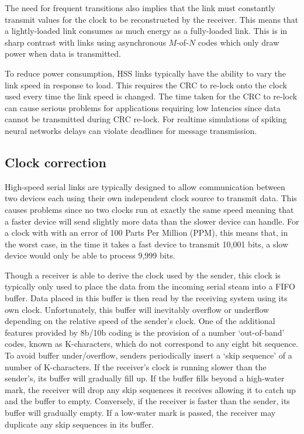 			The need for frequent transitions also implies that the link must
			constantly transmit values for the clock to be reconstructed by the
			receiver. This means that a lightly-loaded link consumes as much energy as
			a fully-loaded link. This is in sharp contrast with links using
			asynchronous $M$-of-$N$ codes which only draw power when data is
			transmitted.
			
			To reduce power consumption, HSS links typically have the ability to vary
			the link speed in response to load.  This requires the CRC to re-lock onto
			the clock used every time the link speed is changed. The time taken for
			the CRC to re-lock can cause serious problems for applications requiring
			low latencies since data cannot be transmitted during CRC re-lock. For
			realtime simulations of spiking neural networks delays can violate
			deadlines for message transmission.
		
		\subsection{Clock correction}
			
			High-speed serial links are typically designed to allow communication
			between two devices each using their own independent clock source to
			transmit data. This causes problems since no two clocks run at exactly the
			same speed meaning that a faster device will send slightly more data than
			the slower device can handle. For a clock with with an error of 100 Parts
			Per Million (PPM), this means that, in the worst case, in the time it
			takes a fast device to transmit 10,001 bits, a slow device would only be
			able to process 9,999 bits.
			
			Though a receiver is able to derive the clock used by the sender, this
			clock is typically only used to place the data from the incoming serial
			steam into a FIFO buffer. Data placed in this buffer is then read by the
			receiving system using its own clock. Unfortunately, this buffer will
			inevitably overflow or underflow depending on the relative speed of the
			sender's clock. One of the additional features provided by 8b/10b coding
			is the provision of a number `out-of-band' codes, known as K-characters,
			which do not correspond to any eight bit sequence. To avoid buffer
			under/overflow, senders periodically insert a `skip sequence' of a number
			of K-characters.  If the receiver's clock is running slower than the
			sender's, its buffer will gradually fill up. If the buffer fills beyond a
			high-water mark, the receiver will drop any skip sequences it receives
			allowing it to catch up and the buffer to empty. Conversely, if the
			receiver is faster than the sender, its buffer will gradually empty.  If a
			low-water mark is passed, the receiver may duplicate any skip sequences in
			its buffer.
			
